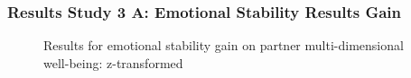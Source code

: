 \documentclass[
  singlecolumn]{article}
\begin{document}
\subsubsection{Results Study 3 A: Emotional Stability Results
Gain}\label{results-study-3-a-emotional-stability-results-gain}

\begin{figure}


\caption{\label{fig-results-emotional-gain}Results for emotional
stability gain on partner multi-dimensional well-being: z-transformed}

\end{figure}%

\newpage{}
\end{document}
